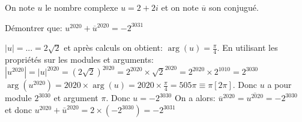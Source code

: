 \documentclass{cornouaille}
\begin{document}
\begin{exercice}[][2]
On note $u$ le nombre complexe $u=2+2i$ et on note $\overline{u}$ son conjugué.

Démontrer que: $u^{2020}+\overline{u}^{2020}=-2^{3031}$

\ldotcarreaux[5]
\begin{solution}
$|u|=...=2\sqrt{2}$ et après calculs on obtient: $\arg(u)=\frac{\pi}{4}$.\newline
En utilisant les propriétés sur les modules et arguments:\newline
$|u^{2020}|=|u|^{2020}=(2\sqrt{2})^{2020}=2^{2020}\times\sqrt{2}^{2020}=2^{2020}\times2^{1010}=2^{3030}$\newline
$\arg\left(u^{2020}\right)=2020\times\arg(u)=2020\times\frac{\pi}{4}=505\pi \equiv \pi [2\pi]$.\newline
Donc $u$ a pour module $2^{3030}$ et argument $\pi$. Donc $u=-2^{3030}$\newline
On a alors: $\overline{u}^{2020}=\overline{u^{2020}}=-2^{3030}$ et donc $u^{2020}+\bar{u}^{2020} = 2\times\left(-2^{3030}\right)= -2^{3031}$
\end{solution}

\end{exercice}
\end{document}
